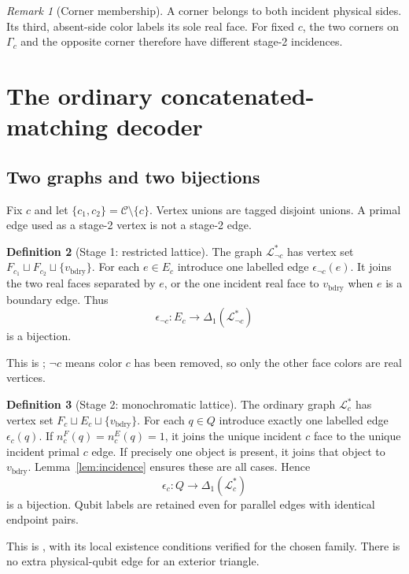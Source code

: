 \documentclass[11pt]{article}
\theoremstyle{definition}
\newtheorem{definition}{Definition}[section]
\theoremstyle{plain}
\theoremstyle{remark}
\newtheorem{remark}[definition]{Remark}
\newcommand{\C}{\mathcal C}
\newcommand{\LL}{\mathcal L}
\newcommand{\bd}{v_{\mathrm{bdry}}}
\newcommand{\eps}{\epsilon}
\begin{document}
\begin{remark}[Corner membership]
A corner belongs to both incident physical sides. Its third,
absent-side color labels its sole real face.
For fixed $c$, the two corners on $\Gamma_c$ and the opposite corner
therefore have different stage-2 incidences.
\end{remark}

\section{The ordinary concatenated-matching decoder}\label{sec:decoder}
\subsection{Two graphs and two bijections}
Fix $c$ and let $\{c_1,c_2\}=\C\setminus\{c\}$.
Vertex unions are tagged disjoint unions. A primal edge used as a
stage-2 vertex is not a stage-2 edge.

\begin{definition}[Stage 1: restricted lattice]\label{def:stage1}
The graph $\LL_{\neg c}^*$ has vertex set
$F_{c_1}\sqcup F_{c_2}\sqcup\{\bd\}$.
For each $e\in E_c$ introduce one labelled edge $\eps_{\neg c}(e)$.
It joins the two real faces separated by $e$, or the one incident real
face to $\bd$ when $e$ is a boundary edge. Thus
\[
 \eps_{\neg c}:E_c\longrightarrow\Delta_1(\LL_{\neg c}^*)
\]
is a bijection.
\end{definition}
This is \cite[Sec.~3, Definition~1]{Lee}; $\neg c$ means color $c$
has been removed, so only the other face colors are real vertices.

\begin{definition}[Stage 2: monochromatic lattice]\label{def:stage2}
The ordinary graph $\LL_c^*$ has vertex set
$F_c\sqcup E_c\sqcup\{\bd\}$.
For each $q\in Q$ introduce exactly one labelled edge $\eps_c(q)$.
If $n_c^F(q)=n_c^E(q)=1$, it joins the unique incident $c$ face to the
unique incident primal $c$ edge. If precisely one object is present,
it joins that object to $\bd$. Lemma~\ref{lem:incidence} ensures
these are all cases. Hence
\[
 \eps_c:Q\longrightarrow\Delta_1(\LL_c^*)
\]
is a bijection. Qubit labels are retained even for parallel edges
with identical endpoint pairs.
\end{definition}
This is \cite[Sec.~3, Definition~2]{Lee}, with its local existence
conditions verified for the chosen family. There is no extra
physical-qubit edge for an exterior triangle.
\end{document}
